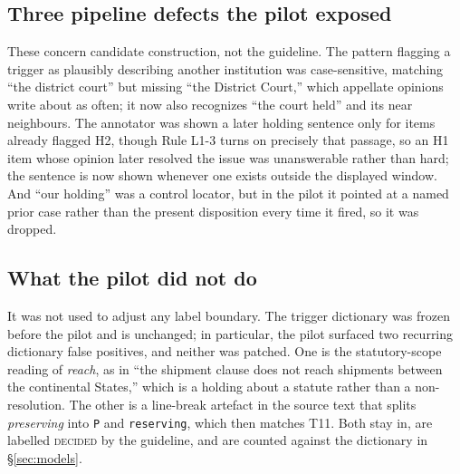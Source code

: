 \subsection{Three pipeline defects the pilot exposed} These concern candidate
construction, not the guideline. The pattern flagging a trigger as plausibly
describing another institution was case-sensitive, matching ``the district
court'' but missing ``the District Court,'' which appellate opinions write about
as often; it now also recognizes ``the court held'' and its near neighbours. The
annotator was shown a later holding sentence only for items already flagged H2,
though Rule L1-3 turns on precisely that passage, so an H1 item whose opinion
later resolved the issue was unanswerable rather than hard; the sentence is now
shown whenever one exists outside the displayed window. And ``our holding'' was
a control locator, but in the pilot it pointed at a named prior case rather than
the present disposition every time it fired, so it was dropped.

\subsection{What the pilot did not do} It was not used to adjust any label
boundary. The trigger dictionary was frozen before the pilot and is unchanged;
in particular, the pilot surfaced two recurring dictionary false positives, and
neither was patched. One is the statutory-scope reading of \emph{reach}, as in
``the shipment clause does not reach shipments between the continental States,''
which is a holding about a statute rather than a non-resolution. The other is a
line-break artefact in the source text that splits \emph{preserving} into
\texttt{P} and \texttt{reserving}, which then matches T11. Both stay in, are
labelled \textsc{decided} by the guideline, and are counted against the
dictionary in \S\ref{sec:models}.
